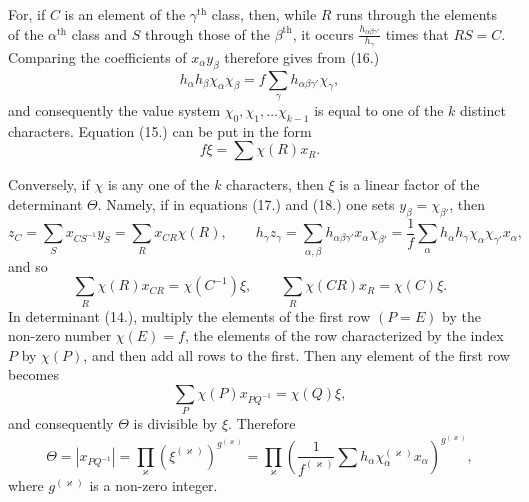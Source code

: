 \documentclass[11pt]{article}
\begin{document}
For, if $C$ is an element of the $\gamma^{\text{th}}$ class, then, while $R$ runs through the elements of the $\alpha^{\text{th}}$ class and $S$ through those of the $\beta^{\text{th}}$, it occurs $\frac{h_{\alpha\beta\gamma'}}{h_\gamma}$ times that $RS=C$. Comparing the coefficients of $x_\alpha y_\beta$ therefore gives from (16.)
\begin{equation*}\tag{19.}
h_\alpha h_\beta\chi_\alpha\chi_\beta=f\sum_\gamma h_{\alpha\beta\gamma'}\chi_\gamma,
\end{equation*}
and consequently the value system $\chi_0,\chi_1,\ldots\chi_{k-1}$ is equal to one of the $k$ distinct characters. Equation (15.) can be put in the form
\begin{equation*}\tag{20.}
f\xi=\sum\chi(R)x_R.
\end{equation*}


Conversely, if $\chi$ is any one of the $k$ characters, then $\xi$ is a linear factor of the determinant $\Theta$. Namely, if in equations (17.) and (18.) one sets $y_\beta=\chi_{\beta'}$, then
\[
z_C=\sum_S x_{CS^{-1}}y_S=\sum_R x_{CR}\chi(R),\qquad h_\gamma z_\gamma=\sum_{\alpha,\beta}h_{\alpha\beta\gamma'}x_\alpha\chi_{\beta'}=\frac{1}{f}\sum_\alpha h_\alpha h_\gamma\chi_\alpha\chi_{\gamma'}x_\alpha,
\]
and so
\begin{equation*}\tag{21.}
\sum_R \chi(R)x_{CR}=\chi(C^{-1})\xi,
\qquad
\sum_R \chi(CR)x_R=\chi(C)\xi.
\end{equation*}
In determinant (14.), multiply the elements of the first row $(P=E)$ by the non-zero number $\chi(E)=f$, the elements of the row characterized by the index $P$ by $\chi(P)$, and then add all rows to the first. Then any element of the first row becomes
\[
\sum_P\chi(P)x_{PQ^{-1}}=\chi(Q)\xi,
\]
and consequently $\Theta$ is divisible by $\xi$. Therefore
\begin{equation*}\tag{22.}
\Theta=\left|x_{PQ^{-1}}\right|=\prod_\varkappa\left(\xi^{(\varkappa)}\right)^{g^{(\varkappa)}}
=\prod_\varkappa\left(\frac{1}{f^{(\varkappa)}}\sum h_\alpha\chi_\alpha^{(\varkappa)}x_\alpha\right)^{g^{(\varkappa)}},
\end{equation*}
where $g^{(\varkappa)}$ is a non-zero integer.
\end{document}
